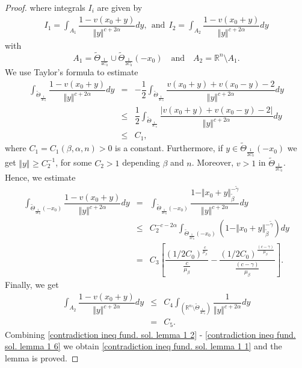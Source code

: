\documentclass[10pt, leqno]{article}
\theoremstyle{definition}
\theoremstyle{remark}
\numberwithin{equation}{section}
\begin{document}
\begin{proof}
where integrals $I_{i}$ are given by
\begin{eqnarray*}
I_{1} = \int_{A_{1}} \dfrac{1 - v(x_{0} + y)}{\Vert y \Vert^{c+2\alpha}} dy, \ \ \text{and} \ \ I_{2} = \int_{A_{2}} \dfrac{1 - v(x_{0} + y)}{\Vert y \Vert^{c+2\alpha}} dy
\end{eqnarray*}
with
$$
A_{1} = \tilde{\Theta}_{\frac{1}{4C_{0}}} \cup \tilde{\Theta}_{\frac{1}{2C_{0}}}(-x_{0}) \quad \text{and}\quad A_{2} = \mathbb{R}^{n} \setminus A_{1}.
$$
We use Taylor's formula to estimate
\begin{eqnarray}
\label{contradiction ineq fund. sol. lemma 1 4}
\int_{\tilde{\Theta}_{\frac{1}{4C_{0}}}} \dfrac{1 - v(x_{0} + y)}{\Vert y \Vert^{c+2\alpha}} dy & = & -\dfrac{1}{2}\int_{\tilde{\Theta}_{\frac{1}{4C_{0}}}} \dfrac{v(x_{0} + y)+ v(x_{0} - y ) - 2}{\Vert y \Vert^{c+2\alpha}} dy \\ \nonumber
& \leq &  \dfrac{1}{2} \int_{\tilde{\Theta}_{\frac{1}{4C_{0}}}} \dfrac{\vert v(x_{0} + y)+ v(x_{0} - y ) - 2 \vert}{\Vert y \Vert^{c+2\alpha}} dy \\ \nonumber
& \leq & C_{1},
\end{eqnarray}
where $C_{1} = C_{1}(\beta, \alpha, n) >0$ is a constant. Furthermore, if $y \in \tilde{\Theta}_{\frac{1}{2C_{0}}}(-x_{0})$ we get $\Vert y \Vert_{} \geq C^{-1}_{2}$, for some $C_{2}>1$ depending $\beta$ and $n$. Moreover, $v > 1$ in $\tilde{\Theta}_{\frac{1}{2C_{0}}}$. Hence, we estimate
\begin{eqnarray}
\label{contradiction ineq fund. sol. lemma 1 5}
\int_{\tilde{\Theta}_{\frac{1}{2C_{0}}}(-x_{0})} \dfrac{1 - v(x_{0} + y)}{\Vert y \Vert^{c+2\alpha}} dy & = &
\int_{\tilde{\Theta}_{\frac{1}{2C_{0}}}(-x_{0})} \dfrac{1 - \Vert x_{0} + y \Vert_{\tilde{\beta}}^{-\tilde{\gamma}}}{\Vert y \Vert^{c+2\alpha}} dy \\ \nonumber
& \leq & C_{2}^{-c-2\alpha}\int_{\tilde{\Theta}_{\frac{1}{2C_{0}}}(-x_{0})} \left(1 - \Vert x_{0} + y \Vert_{\tilde{\beta}}^{-\tilde{\gamma}} \right) dy \\ \nonumber
& = & C_{3} \left[\dfrac{(1/2C_{0})^{\frac{c}{\mu_{\beta}}}}{\frac{c}{\mu_{\beta}}} - \dfrac{(1/2C_{0})^{\frac{(c - \gamma)}{\mu_{\beta}}}}{\frac{(c - \gamma)}{\mu_{\beta}}} \right].
\end{eqnarray}
Finally, we get
\begin{eqnarray}
\label{contradiction ineq fund. sol. lemma 1 6}
\int_{A_{2}} \dfrac{1 - v(x_{0} + y)}{\Vert y \Vert^{c+2\alpha}} dy &\leq & C_{4}\int_{(\mathbb{R}^{n} \setminus \tilde{\Theta}_{\frac{1}{4C_{0}}})} \dfrac{1}{\Vert y \Vert^{c+2\alpha}} dy \\ \nonumber
& = & C_{5}.
\end{eqnarray}
Combining \eqref{contradiction ineq fund. sol. lemma 1 2} - \eqref{contradiction ineq fund. sol. lemma 1 6} we obtain \eqref{contradiction ineq fund. sol. lemma 1 1} and the lemma is proved.
\end{proof}
\end{document}
